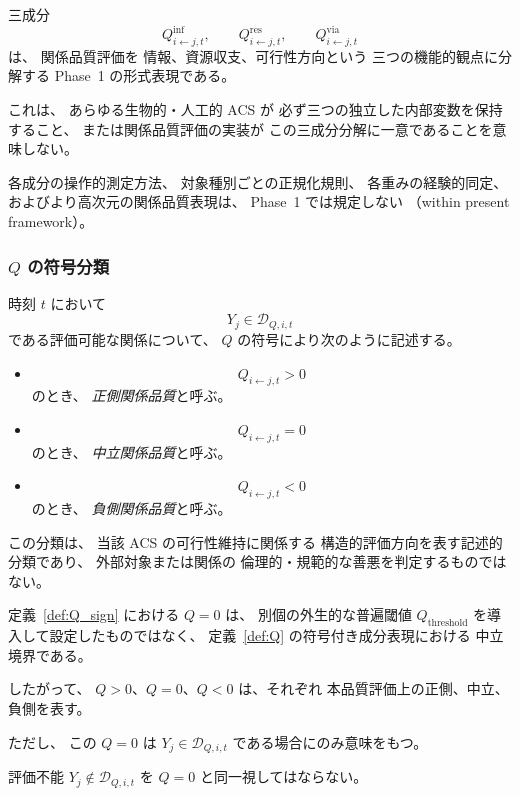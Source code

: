 \begin{remark}
\label{rem:Q_form}
三成分
\[
  Q^{\mathrm{inf}}_{i\leftarrow j,t},
  \qquad
  Q^{\mathrm{res}}_{i\leftarrow j,t},
  \qquad
  Q^{\mathrm{via}}_{i\leftarrow j,t}
\]
は、
関係品質評価を
情報、資源収支、可行性方向という
三つの機能的観点に分解する
Phase~1 の形式表現である。

これは、
あらゆる生物的・人工的 ACS が
必ず三つの独立した内部変数を保持すること、
または関係品質評価の実装が
この三成分分解に一意であることを意味しない。

各成分の操作的測定方法、
対象種別ごとの正規化規則、
各重みの経験的同定、
およびより高次元の関係品質表現は、
Phase~1 では規定しない
（within present framework）。
\end{remark}

\subsubsection{$Q$ の符号分類}

\begin{definition}[$Q$ の符号による関係品質分類]
\label{def:Q_sign}
時刻 $t$ において
\[
  Y_j\in\mathcal D_{Q,i,t}
\]
である評価可能な関係について、
$Q$ の符号により次のように記述する。

\begin{itemize}
  \item
  \[
    Q_{i\leftarrow j,t}>0
  \]
  のとき、
  \emph{正側関係品質}と呼ぶ。

  \item
  \[
    Q_{i\leftarrow j,t}=0
  \]
  のとき、
  \emph{中立関係品質}と呼ぶ。

  \item
  \[
    Q_{i\leftarrow j,t}<0
  \]
  のとき、
  \emph{負側関係品質}と呼ぶ。
\end{itemize}

この分類は、
当該 ACS の可行性維持に関係する
構造的評価方向を表す記述的分類であり、
外部対象または関係の
倫理的・規範的な善悪を判定するものではない。
\end{definition}

\begin{remark}[$Q=0$ は定義された評価の中立境界である]
\label{rem:Q_threshold}
定義~\ref{def:Q_sign} における
$Q=0$
は、
別個の外生的な普遍閾値
$Q_{\mathrm{threshold}}$
を導入して設定したものではなく、
定義~\ref{def:Q} の符号付き成分表現における
中立境界である。

したがって、
$Q>0$、$Q=0$、$Q<0$
は、それぞれ
本品質評価上の正側、中立、負側を表す。

ただし、
この $Q=0$ は
$Y_j\in\mathcal D_{Q,i,t}$
である場合にのみ意味をもつ。

評価不能
$Y_j\notin\mathcal D_{Q,i,t}$
を
$Q=0$ と同一視してはならない。
\end{remark}

